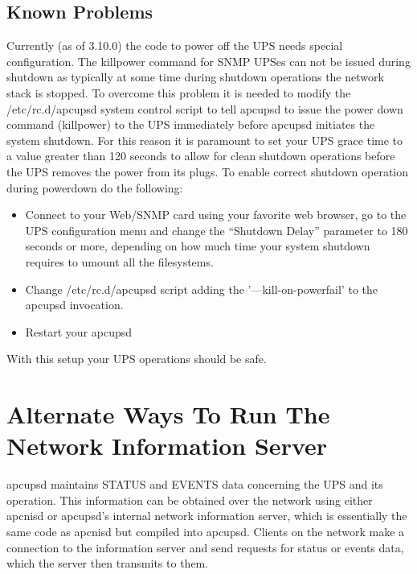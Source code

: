 {{{{{{{{{\label{Known-Problems}

\subsection*{Known Problems}

Currently (as of 3.10.0) the code to power off the UPS needs special
configuration. The killpower command for SNMP UPSes can not be issued during
shutdown as typically at some time during shutdown operations the network
stack is stopped. To overcome this problem it is needed to modify the
/etc/rc.d/apcupsd system control script to tell apcupsd to issue the power
down command (killpower) to the UPS immediately before apcupsd initiates the
system shutdown. For this reason it is paramount to set your UPS grace time to
a value greater than 120 seconds to allow for clean shutdown operations before
the UPS removes the power from its plugs. To enable correct shutdown operation
during powerdown do the following:  

\begin{itemize}
\item Connect to your Web/SNMP card using your favorite web browser, go to the
   UPS configuration menu and change the ``Shutdown Delay'' parameter to 180
   seconds or more, depending on how much time your system shutdown requires to
umount all the filesystems.  
\item Change /etc/rc.d/apcupsd script adding the '{---}kill-on-powerfail' to
   the apcupsd invocation.  
\item Restart your apcupsd 
   \end{itemize}

With this setup your UPS operations should be safe. 

\label{Alternate-Ways-To-Run-The-Network-Information-Server}

\section*{Alternate Ways To Run The Network Information Server}

\label{index-NIS-alternate-was-of-running-165}
apcupsd maintains STATUS and EVENTS data concerning the UPS and its operation.
This information can be obtained over the network using either apcnisd or
apcupsd's internal network information server, which is essentially the same
code as apcnisd but compiled into apcupsd. Clients on the network make a
connection to the information server and send requests for status or events
data, which the server then transmits to them.  

}}}}}}}}}
